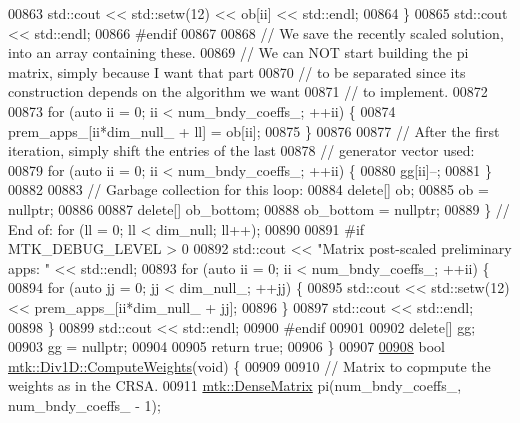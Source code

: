 \begin{DoxyCode}
{{00863       std::cout << std::setw(12) << ob[ii] << std::endl;
00864     \}
00865     std::cout << std::endl;
00866 \textcolor{preprocessor}{    #endif}
00867 
00868     \textcolor{comment}{// We save the recently scaled solution, into an array containing these.}
00869     \textcolor{comment}{// We can NOT start building the pi matrix, simply because I want that part}
00870     \textcolor{comment}{// to be separated since its construction depends on the algorithm we want}
00871     \textcolor{comment}{// to implement.}
00872 
00873     \textcolor{keywordflow}{for} (\textcolor{keyword}{auto} ii = 0; ii < num\_bndy\_coeffs\_; ++ii) \{
00874       prem\_apps\_[ii*dim\_null\_ + ll] = ob[ii];
00875     \}
00876 
00877     \textcolor{comment}{// After the first iteration, simply shift the entries of the last}
00878     \textcolor{comment}{// generator vector used:}
00879     \textcolor{keywordflow}{for} (\textcolor{keyword}{auto} ii = 0; ii < num\_bndy\_coeffs\_; ++ii) \{
00880       gg[ii]--;
00881     \}
00882 
00883     \textcolor{comment}{// Garbage collection for this loop:}
00884     \textcolor{keyword}{delete}[] ob;
00885     ob = \textcolor{keyword}{nullptr};
00886 
00887     \textcolor{keyword}{delete}[] ob\_bottom;
00888     ob\_bottom = \textcolor{keyword}{nullptr};
00889   \} \textcolor{comment}{// End of: for (ll = 0; ll < dim\_null; ll++);}
00890 
00891 \textcolor{preprocessor}{  #if MTK\_DEBUG\_LEVEL > 0}
00892   std::cout << \textcolor{stringliteral}{"Matrix post-scaled preliminary apps: "} << std::endl;
00893   \textcolor{keywordflow}{for} (\textcolor{keyword}{auto} ii = 0; ii < num\_bndy\_coeffs\_; ++ii) \{
00894     \textcolor{keywordflow}{for} (\textcolor{keyword}{auto} jj = 0; jj < dim\_null\_; ++jj) \{
00895       std::cout << std::setw(12) << prem\_apps\_[ii*dim\_null\_ + jj];
00896     \}
00897     std::cout << std::endl;
00898   \}
00899   std::cout << std::endl;
00900 \textcolor{preprocessor}{  #endif}
00901 
00902   \textcolor{keyword}{delete}[] gg;
00903   gg = \textcolor{keyword}{nullptr};
00904 
00905   \textcolor{keywordflow}{return} \textcolor{keyword}{true};
00906 \}
00907 
\hypertarget{mtk__div__1d_8cc_source_l00908}{}\hyperlink{classmtk_1_1Div1D_aaadd6a6e6836bb94841c4c35dffab828}{00908} \textcolor{keywordtype}{bool} \hyperlink{classmtk_1_1Div1D_aaadd6a6e6836bb94841c4c35dffab828}{mtk::Div1D::ComputeWeights}(\textcolor{keywordtype}{void}) \{
00909 
00910   \textcolor{comment}{// Matrix to copmpute the weights as in the CRSA.}
00911   \hyperlink{classmtk_1_1DenseMatrix}{mtk::DenseMatrix} pi(num\_bndy\_coeffs\_, num\_bndy\_coeffs\_ - 1);
}}
\end{DoxyCode}
